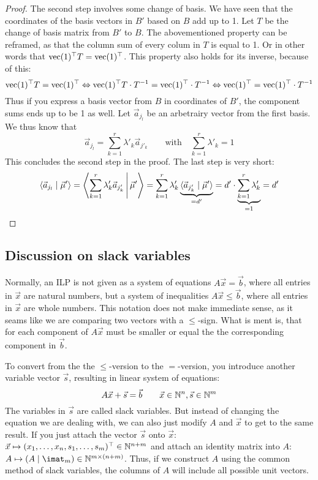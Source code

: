 \begin{proof}
    The second step involves some change of basis. We have seen that the coordinates of the basis vectors in $B'$ based on $B$ add up to 1. Let $T$ be the change of basis matrix from $B'$ to $B$. The abovementioned property can be reframed, as that the column sum of every colum in $T$ is equal to 1. Or in other words that $\operatorname{vec}(1)^\top T = \operatorname{vec}(1)^\top$. This property also holds for its inverse, because of this:
    $$\operatorname{vec}(1)^\top T = \operatorname{vec}(1)^\top \Leftrightarrow \operatorname{vec}(1)^\top T\cdot T^{-1} = \operatorname{vec}(1)^\top\cdot T^{-1} \Leftrightarrow \operatorname{vec}(1)^\top = \operatorname{vec}(1)^\top\cdot T^{-1}$$
    Thus if you express a basis vector from $B$ in coordinates of $B'$, the component sums ends up to be 1 as well. Let $\vec a_{j_l}$ be an arbetrairy vector from the first basis. We thus know that
    $$\vec a_{j_l} = \sum_{k=1}^{r}\lambda'_k \vec a_{j'_k} \qquad \textrm{with}\quad \sum_{k=1}^{r}\lambda'_k = 1$$
    This concludes the second step in the proof. The last step is very short:
    $$\langle \vec a_{j_l} \mid \vec\mu' \rangle = \left\langle \sum_{k=1}^{r}\lambda'_k \vec a_{j'_k} \,\middle|\, \vec\mu' \right\rangle = \sum_{k=1}^{r} \lambda'_k \underbrace{\langle \vec a_{j'_k} \mid \vec\mu' \rangle}_{=d'} = d' \cdot \underbrace{\sum_{k=1}^{r} \lambda'_k}_{=1} = d'$$
\end{proof}

\subsection{Discussion on slack variables}
Normally, an ILP is not given as a system of equations $A\vec x = \vec b$, where all entries in $\vec x$ are natural numbers, but a system of inequalities $A\vec x \leq \vec b$, where all entries in $\vec x$ are whole numbers. This notation does not make immediate sense, as it seams like we are comparing two vectors with a $\leq$-sign. What is ment is, that for each component of $A\vec x$ must be smaller or equal the the corresponding component in $\vec b$. 

To convert from the the $\leq$-version to the $=$-version, you introduce another variable vector $\vec s$, resulting in linear system of equations:
$$A\vec x + \vec s = \vec b \qquad \vec x \in \mathbb{N}^n, \vec s \in\mathbb{N}^m$$
The variables in $\vec s$ are called slack variables. But instead of changing the equation we are dealing with, we can also just modify $A$ and $\vec x$ to get to the same result. If you just attach the vector $\vec s$ onto $\vec x$: $\vec x \mapsto (x_1, \dots, x_n, s_1, \dots, s_m)^\top \in \mathbb{N}^{n+m}$ and attach an identity matrix into $A$: $A \mapsto (A \mid\imat_m) \in \N^{m \times (n + m)}$. Thus, if we construct $A$ using the common method of slack variables, the columns of $A$ will include all possible unit vectors.

